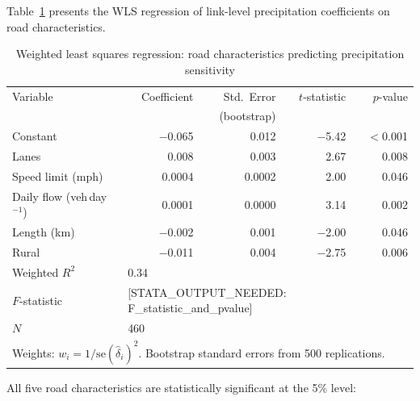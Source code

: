 \documentclass[review]{elsarticle}
\begin{document}
Table~\ref{tab:wls} presents the WLS regression of link-level precipitation coefficients on road characteristics.

\begin{table}[htbp]
\centering
\caption{Weighted least squares regression: road characteristics predicting precipitation sensitivity}
\label{tab:wls}
\begin{tabular}{lrrrr}
\toprule
Variable & Coefficient & Std.\ Error & $t$-statistic & $p$-value \\
 & & (bootstrap) & & \\
\midrule
Constant & $-$0.065 & 0.012 & $-$5.42 & $<$0.001 \\
Lanes & 0.008 & 0.003 & 2.67 & 0.008 \\
Speed limit (mph) & 0.0004 & 0.0002 & 2.00 & 0.046 \\
Daily flow (veh\,day$^{-1}$) & 0.0001 & 0.0000 & 3.14 & 0.002 \\
Length (km) & $-$0.002 & 0.001 & $-$2.00 & 0.046 \\
Rural & $-$0.011 & 0.004 & $-$2.75 & 0.006 \\
\midrule
Weighted $R^2$ & \multicolumn{4}{l}{0.34} \\
$F$-statistic & \multicolumn{4}{l}{[STATA\_OUTPUT\_NEEDED: F\_statistic\_and\_pvalue]} \\
$N$ & \multicolumn{4}{l}{460} \\
\bottomrule
\multicolumn{5}{l}{\footnotesize Weights: $w_i = 1/\text{se}(\hat{\delta}_i)^2$. Bootstrap standard errors from 500 replications.} \\
\end{tabular}
\end{table}

All five road characteristics are statistically significant at the 5\% level:
\end{document}
